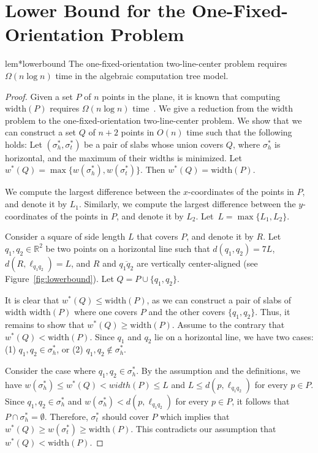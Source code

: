 \documentclass[english,a4paper, cleveref, autoref, thm-restate, nolineno]{socg-lipics-v2021}
\theoremstyle{star}
\theoremstyle{claimstar}
\newcommand{\width}{\ensuremath{\mathrm{width}}}
\begin{document}
\onefixed*



\section{Lower Bound for the One-Fixed-Orientation Problem}
\label{sec:lowerbound}

\begin{restatable}{lem*}{lowerbound}
    The one-fixed-orientation two-line-center problem requires $\Omega (n\log n)$ time in the algebraic computation tree model. 
\end{restatable}


\begin{proof}
    Given a set $P$ of $n$ points in the plane, it is known that computing $\width(P)$ requires $\Omega(n \log n)$ time~\cite{Houle_width, lee1986geometric}.
    We give a reduction from the width problem to the one-fixed-orientation two-line-center problem.
    We show that we can construct a set $Q$ of $n+2$ points in $O(n)$ time such that the following holds:
    Let $(\sigma_h^*, \sigma_t^*)$ be a pair of slabs whose union covers $Q$, where $\sigma_h^*$ is horizontal, and the maximum of their widths is minimized.
    Let $w^*(Q) = \max\{ w(\sigma_h^*), w(\sigma_t^*)\}$.
    Then $w^*(Q) = \width(P)$.


    
    We compute the largest difference between the $x$-coordinates of the points in $P$, and denote it by $L_1$. Similarly, we compute the largest difference between the $y$-coordinates of the points in $P$, and denote it by $L_2$.
    Let~$L = \max\{L_1, L_2\}$.
    
    Consider a square of side length $L$ that covers $P$, and denote it by $R$.
    Let $q_1, q_2 \in \mathbb{R}^2$ be two points on a horizontal line such that $d(q_1, q_2) = 7L$, $d(R, \ell_{q_1q_2}) = L$, and $R$ and $\overline{q_1q_2}$ are vertically center-aligned (see Figure~\ref{fig:lowerbound}).
    Let $Q = P \cup \{q_1, q_2\}$.

    It is clear that $w^*(Q) \le \width(P)$, as we can construct a pair of slabs of width $\width(P)$ where one covers $P$ and the other covers $\{q_1, q_2\}$. 
    Thus, it remains to show that $w^*(Q) \ge \width(P)$. 
    Assume to the contrary that $w^*(Q) < \width(P)$. 
    Since $q_1$ and $q_2$ lie on a horizontal line, we have two cases: 
    (1) $q_1, q_2 \in \sigma_h^*$, or 
    (2) $q_1, q_2 \notin \sigma_h^*$.


    Consider the case where $q_1, q_2 \in \sigma_h^*$.
    By the assumption and the definitions, we have $w(\sigma_h^*) \le w^*(Q) < width (P) \le L$ and 
    $ L \le d(p, \ell_{q_1q_2})$ for every $p\in P$. 
    Since $q_1, q_2 \in \sigma_h^*$ and $w(\sigma_h^*) < d(p, \ell_{q_1q_2})$ for every $p\in P$, 
    it follows that $P\cap \sigma_h^* = \emptyset$.  
    Therefore, $\sigma_t^*$ should cover $P$ which implies that $w^*(Q) \ge w(\sigma_t^*) \ge \width(P)$. This contradicts our assumption that $w^*(Q) < \width(P)$.


\end{proof}
\end{document}

